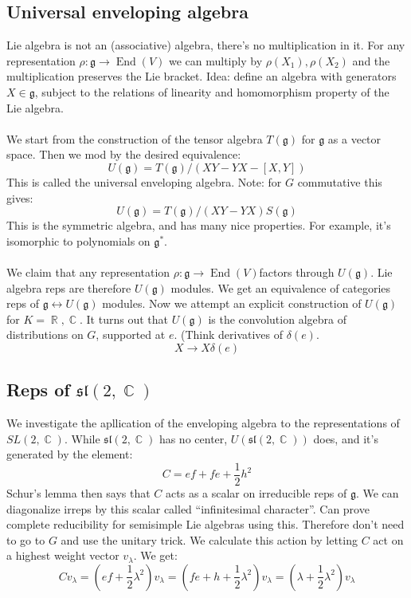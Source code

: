 \documentclass[12 pt]{article}
\DeclareMathOperator {\R} {\mathbb{R}}
\DeclareMathOperator {\C} {\mathbb{C}}
\DeclareMathOperator {\End} {End}
\theoremstyle{plain}
\theoremstyle{definition}
\theoremstyle{remark}
\begin{document}
\subsection*{Universal enveloping algebra}
Lie algebra is not an (associative) algebra, there's no multiplication in it. For any representation $\rho : \mathfrak{g} \to \End(V)$ we can multiply by $\rho(X_1), \rho(X_2)$ and the multiplication preserves the Lie bracket. Idea: define an algebra with generators $X\in \mathfrak{g}$, subject to the relations of linearity and homomorphism property of the Lie algebra.
\\
\\
We start from the construction of the tensor algebra $T(\mathfrak{g})$ for $\mathfrak{g}$ as a vector space. Then we mod by the desired equivalence:
\[     U(\mathfrak{g}) = T(\mathfrak{g}) / (XY - YX - [X,Y])      \]
This is called the universal enveloping algebra. Note: for $G$ commutative this gives:
\[       U(\mathfrak{g}) = T(\mathfrak{g}) / (XY - YX)  S(\mathfrak{g})   \]
This is the symmetric algebra, and has many nice properties. For example, it's isomorphic to polynomials on $\mathfrak{g}^*$.
\\
\\
We claim that any representation $\rho : \mathfrak{g} \to \End(V)$factors through $U(\mathfrak{g})$. Lie algebra reps are therefore $U(\mathfrak{g})$ modules. We get an equivalence of categories reps of $\mathfrak{g} \longleftrightarrow U(\mathfrak{g})$ modules. Now we attempt an explicit construction of $U(\mathfrak{g})$ for $K = \R, \C$. It turns out that $U(\mathfrak{g})$ is the convolution algebra of distributions on $G$, supported at $e$. (Think derivatives of $\delta(e)$.
\[      X \to X\delta(e)      \]

\subsection*{Reps of $\mathfrak{sl}(2,\C)$}
We investigate the apllication of the enveloping algebra to the representations of $SL(2,\C)$. While $\mathfrak{sl}(2,\C)$ has no center, $U(\mathfrak{sl}(2,\C))$ does, and it's generated by the element:
\[       C = ef + fe + \frac{1}{2} h^2      \]
Schur's lemma then says that $C$ acts as a scalar on irreducible reps of $\mathfrak{g}$. We can diagonalize irreps by this scalar called ``infinitesimal character''. Can prove complete reducibility for semisimple Lie algebras using this. Therefore don't need to go to $G$ and use the unitary trick. We calculate this action by letting $C$ act on a highest weight vector $v_{\lambda}$. We get:
\[      C v_{\lambda} = (ef + \frac{1}{2}\lambda^2) v_{\lambda} = (fe + h + \frac{1}{2}\lambda^2) v_{\lambda} =  (\lambda + \frac{1}{2}\lambda^2) v_{\lambda}       \]
\end{document}
